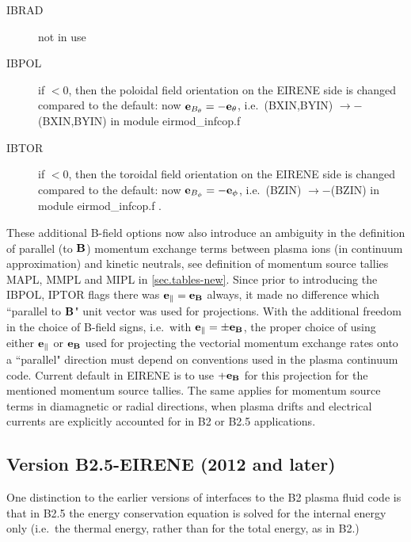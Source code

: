 \begin{description}
  \item[IBRAD] not in use
  \item[IBPOL] if $< 0$, then the poloidal field
        orientation on the EIRENE side is changed compared to the default: now
        $\mathbf{e}_{B_\theta} = -\mathbf{e}_\theta$, i.e.\ (BXIN,BYIN) $\rightarrow - $(BXIN,BYIN) in
        module eirmod\_infcop.f
  \item[IBTOR] if $< 0$, then the toroidal field
        orientation on the EIRENE side is changed compared to the default: now
        $\mathbf{e}_{B_\phi} = -\mathbf{e}_\phi$, i.e.\ (BZIN) $\rightarrow - $(BZIN) in module
        eirmod\_infcop.f .
\end{description}

These additional B-field options now also introduce an ambiguity in the
definition of parallel (to $\mathbf{B}$) momentum exchange terms between plasma ions
(in continuum approximation) and kinetic neutrals, see definition of momentum
source tallies MAPL, MMPL and MIPL in \cref{sec.tables-new}.
Since prior to introducing the IBPOL, IPTOR flags there was  $\mathbf{e}_\| =
  \mathbf{e}_{\mathbf{B}}$ always, it made no difference which ``parallel to $\mathbf{B}$" unit vector
was used for projections.
With the additional freedom in the choice of B-field signs, i.e.\ with $\mathbf{e}_\|
  = \pm \mathbf{e}_{\mathbf{B}}$, the proper choice of using either $\mathbf{e}_\|$ or $\mathbf{e}_{\mathbf{B}}$
used for projecting the vectorial momentum exchange rates onto a ``parallel"
direction must depend on conventions used in the plasma continuum code.
Current default in EIRENE is to use $+\mathbf{e}_{\mathbf{B}}$ for this projection for the
mentioned momentum source tallies.
The same applies for momentum source terms in diamagnetic or radial directions,
when plasma drifts and electrical currents are explicitly accounted for in B2
or B2.5 applications.

\subsection{Version B2.5-EIRENE (2012 and later)} \label{sec2.14.4} 

One distinction to the earlier versions of interfaces to the B2 plasma fluid
code is that in B2.5 the energy conservation equation is solved for the
internal energy only (i.e.\ the thermal energy, rather than for the total
energy, as in B2.)


